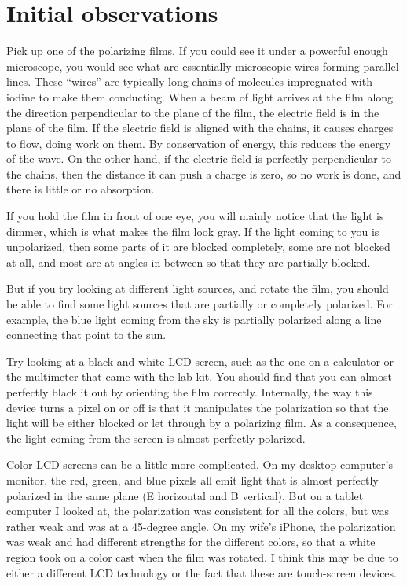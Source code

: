 \section{Initial observations}


Pick up one of the polarizing films. If you could see it under a powerful enough microscope,
you would see what are essentially microscopic wires forming parallel lines. These ``wires''
are typically long chains of molecules impregnated with iodine to make them conducting. When a beam
of light arrives at the film along the direction perpendicular to the plane of the film, the electric field
is in the plane of the film. If the electric field is aligned with the chains, it causes charges
to flow, doing work on them. By conservation of energy, this reduces the energy of the wave.
On the other hand, if the electric field is perfectly perpendicular to the chains, then
the distance it can push a charge is zero, so no work is done, and there is little or no absorption.

If you hold the film in front of one eye, you will mainly notice that the light is dimmer,
which is what makes the film look gray.
If the light coming to you is unpolarized, then some parts of it are blocked completely, some
are not blocked at all, and most are at angles in between so that they are partially blocked.

But if you try looking at different light sources, and rotate the film, you should be able to
find some light sources that are partially or completely polarized. For example, the blue light coming
from the sky is partially polarized along a line connecting that point to the sun.


Try looking at a black and white LCD screen, such as the one on a
calculator or the multimeter that came with the lab kit. You should find that you can almost perfectly
black it out by orienting the film correctly.
Internally, the way this device turns a pixel on or off is that it manipulates the polarization
so that the light will be either blocked or let through by a polarizing film. As a consequence,
the light coming from the screen is almost perfectly polarized. 

Color LCD screens can be a little more complicated. On my desktop computer's monitor, the red, green,
and blue pixels all emit light that is almost perfectly polarized in the same plane (E horizontal and B vertical). But on a tablet
computer I looked at, the polarization was consistent for all the colors, but was rather weak and
was at a 45-degree angle. On my wife's iPhone, the polarization was weak and had different strengths
for the different colors, so that a white region took on a color cast when the film was rotated.
I think this may be due to either a different LCD technology or the fact that these are touch-screen devices.

